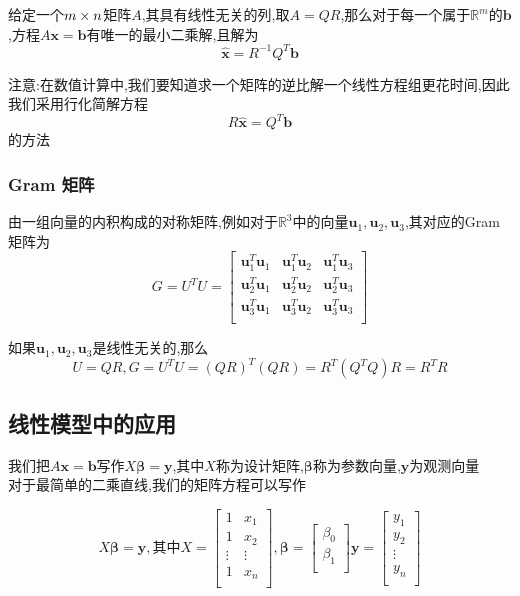 \documentclass{article}
\newcommand{\RR}{\mathbb{R}}
\newcommand{\ve}{\boldsymbol}
\begin{document}
\begin{CJK}{UTF8}{gkai}
给定一个$m\times n$矩阵$A$,其具有线性无关的列,取$A = Q R$,那么对于每一个属于$\RR^m$的$\ve{b}$,方程$A\ve{x} = \ve{b}$有唯一的最小二乘解,且解为
\[\hat{\ve{x}}  = R^{-1}Q^T \ve{b}\]

注意:在数值计算中,我们要知道求一个矩阵的逆比解一个线性方程组更花时间,因此我们采用行化简解方程
\[R\hat{\ve{x}} = Q^T \ve{b}\]
的方法
\subsubsection{Gram 矩阵}
由一组向量的内积构成的对称矩阵,例如对于$\RR^3$中的向量$\ve{u}_1,\ve{u}_2,\ve{u}_3$,其对应的Gram矩阵为
\[G = U^T U =\begin{bmatrix}
    \ve{u}_1^T \ve{u}_1 &\ve{u}_1^T \ve{u}_2&\ve{u}_1^T \ve{u}_3\\
    \ve{u}_2^T \ve{u}_1 &\ve{u}_2^T \ve{u}_2&\ve{u}_2^T \ve{u}_3\\
    \ve{u}_3^T \ve{u}_1 &\ve{u}_3^T \ve{u}_2&\ve{u}_3^T \ve{u}_3\\     
\end{bmatrix}\]

如果$\ve{u}_1,\ve{u}_2,\ve{u}_3$是线性无关的,那么
\[U = QR, G = U^T U = (QR)^T (QR) = R^T(Q^T Q)R = R^T R\]
\subsection{线性模型中的应用}
我们把$A\ve{x} = \ve{b}$写作$X\ve{\beta} = \ve{y}$,其中$X$称为设计矩阵,$\ve{\beta}$称为参数向量,$\ve{y}$为观测向量\\

对于最简单的二乘直线,我们的矩阵方程可以写作

\[X \ve{\beta} = \ve{y},\text{其中} X = \begin{bmatrix}
1 & x_1\\
1 & x_2\\
\vdots &\vdots\\
1 & x_n\\
\end{bmatrix},\ve{\beta} = \begin{bmatrix}
    \beta_0\\
    \beta_1\\
\end{bmatrix}
\ve{y} = \begin{bmatrix}
    y_1\\
    y_2\\
    \vdots\\
    y_n\\
\end{bmatrix}\]


\end{CJK}
\end{document}
